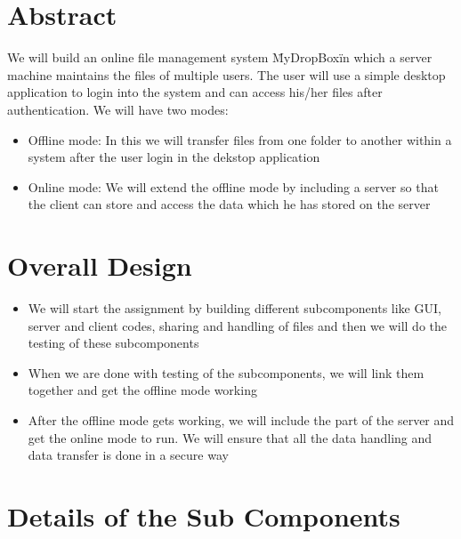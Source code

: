 \documentclass{article}
\title{\vspace{-2cm}{Assignment 1: COP 290: Design Document}}
\author{Aniket Khandelwal(2013CS10209),
Anupam Khandelwal(2013CS10212),\\
Ronak Khandelwal(2013CS50295)}
\date{\today}
\begin{document}
\maketitle

\tableofcontents
\pagebreak

\section{Abstract}
We will build an online file management system \"MyDropBox\" in which a server machine maintains the files of multiple users. The user will use  a simple desktop application to 
login into the system and can access his/her files after authentication. We will have two modes:
\begin{itemize}
\item Offline mode: In this we will transfer files from one folder to another within a system after the user login in the dekstop application
\item Online mode: We will extend the offline mode by including a server so that the client can store and access the data which he has stored on the server
\end{itemize}
\section{Overall Design}
\begin{itemize}
\item We will start the assignment by building different subcomponents like GUI, server and client codes, sharing and handling of files and then we will do the testing of these subcomponents
\item When we are done with testing of the subcomponents, we will link them together and get the offline mode working
\item After the offline mode gets working, we will include the part of the server and get the online mode to run. We will ensure that all the data handling and data transfer is done in a secure way
\end{itemize}

\section{Details of the Sub Components}
\end{document}
